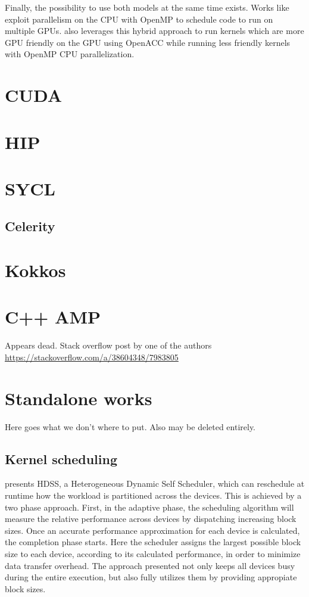 Finally, the possibility to use both models at the same time exists. Works like \cite{openmp_openacc_multigpus} exploit parallelism on the CPU with OpenMP to schedule code to run on multiple GPUs. \cite{openmp_openacc_molecular_docking} also leverages this hybrid approach to run kernels which are more GPU friendly on the GPU using OpenACC while running less friendly kernels with OpenMP CPU parallelization. 

\section{CUDA}

\section{HIP}

\section{SYCL}
\subsection{Celerity}

\section{Kokkos}
\cite{kokkos}

\section{C++ AMP}
Appears dead. Stack overflow post by one of the authors \url{https://stackoverflow.com/a/38604348/7983805}


\section{Standalone works}

Here goes what we don't where to put. Also may be deleted entirely.

\subsection{Kernel scheduling}

\cite{dynamic_self_scheduling} presents HDSS, a Heterogeneous Dynamic Self Scheduler, which can reschedule at runtime how the workload is partitioned across the devices. This is achieved by a two phase approach. First, in the adaptive phase, the scheduling algorithm will measure the relative performance across devices by dispatching increasing block sizes. Once an accurate performance approximation for each device is calculated, the completion phase starts. Here the scheduler assigns the largest possible block size to each device, according to its calculated performance, in order to minimize data transfer overhead. The approach presented not only keeps all devices busy during the entire execution, but also fully utilizes them by providing appropiate block sizes. 
